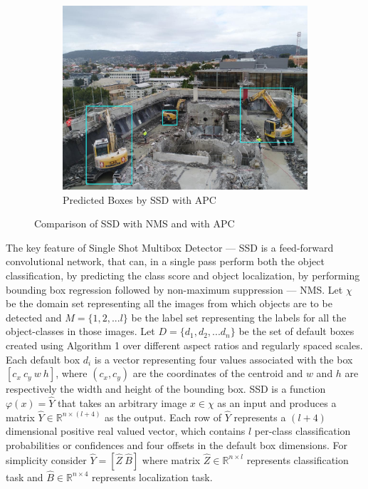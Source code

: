 \documentclass[conference]{IEEEtran}
\begin{document}
\begin{figure}
\begin{subfigure}[b]{0.30\linewidth}
        \includegraphics[width=\textwidth]{images/SSD-APC.jpg}
        \caption{Predicted Boxes by SSD with APC}
        \label{fig:ssdapc}
    \end{subfigure}
    \caption{Comparison of SSD with NMS and with APC}\label{fig:comparison}
\end{figure}

The key feature of Single Shot Multibox Detector --- SSD \cite{DBLP:journals/corr/LiuAESR15} is a feed-forward convolutional network, that can, in a single pass perform both the object classification, by predicting the class score and object localization, by performing bounding box regression followed by non-maximum suppression --- NMS. Let $\chi$ be the domain set representing all the images from which  objects are to be detected and $M = \{1, 2, ... l\}$ be the label set representing the labels for all the object-classes in those images. Let $D = \{d_1, d_2, ...d_n\}$ be the set of default boxes created using Algorithm 1 over different aspect ratios and regularly spaced scales. Each default box $d_i$ is a vector representing four values associated with the box $[c_x\ c_y\ w\ h]$, where $(c_x, c_y)$ are the coordinates of the centroid and $w$ and $h$ are respectively the width and height of the bounding box. SSD is a function $\varphi(x) = \hat{Y}$ that takes an arbitrary image $x \in \chi$ as an input and produces a matrix $\hat{Y} \in \mathbb{R}^{n \times (l + 4)}$ as the output. Each row of $\hat{Y}$ represents a $(l + 4)$ dimensional positive real valued vector, which contains $l$ per-class classification probabilities or confidences and four offsets in the default box dimensions. For simplicity consider $\hat{Y} = [\hat{Z}\ \hat{B}]$ where matrix $\hat{Z} \in \mathbb{R}^{n \times l}$ represents classification task and $\hat{B} \in \mathbb{R}^{n \times 4}$ represents localization task. 
\end{document}
